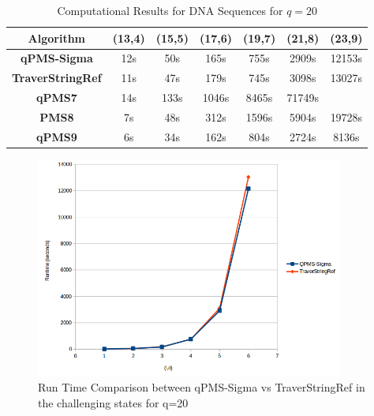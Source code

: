 {\begin{table}
	\begin{center}
		\caption{Computational Results for DNA Sequences for $q=20$}
		\label{dataq20}
		\begin{tabular}{|c|c|c|c|c|c|c|}
			\hline 
			\textbf{Algorithm} & \textbf{(13,4)} & \textbf{(15,5)} & \textbf{(17,6)} & \textbf{(19,7)} & \textbf{(21,8)} & \textbf{(23,9)} \\
			\hline
			\textbf{qPMS-Sigma} & 12s & 50s & 165s & 755s & 2909s & 12153s \\
			\hline
			\textbf{TraverStringRef} & 11s & 47s & 179s & 745s & 3098s & 13027s \\
			\hline
			\textbf{qPMS7} & 14s & 133s & 1046s & 8465s & 71749s & \\ \hline
			\textbf{PMS8} & 7s & 48s & 312s & 1596s & 5904s & 19728s\\ \hline
			\textbf{qPMS9} & 6s & 34s & 162s & 804s & 2724s & 8136s \\ \hline
		\end{tabular}
	\end{center}
\end{table}
\begin{figure}[!tb]
	\centering
	\includegraphics[width=0.9\textwidth]{figures/chart1.png}
	\caption{Run Time Comparison between qPMS-Sigma vs TraverStringRef in the challenging states for q=20}
	\label{fig:chart1}
\end{figure}

}

